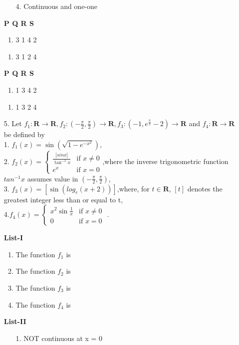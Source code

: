 \documentclass[journal,12pt,twocolumn]{IEEEtran}
\theoremstyle{remark}
\begin{document}
\begin{enumerate}
\begin{multicols}{2}
\begin{enumerate}
					\item[4.]  Continuous and one-one
				\end{enumerate}
		\end{multicols}
		\begin{multicols}{2}
			\textbf{   P Q R S}
			\begin{enumerate}[label=(\alph*)]
				\item 3 1 4 2
			\end{enumerate}
			\begin{enumerate}[label=(\alph*), start=3]
				\item 3 1 2 4
			\end{enumerate}
			\columnbreak
			\textbf{   P Q R S }
			\begin{enumerate}[label=(\alph*), start=2]
				\item 1 3 4 2 
			\end{enumerate}
			\begin{enumerate}[label=(\alph*)]
				\item 1 3 2 4
			\end{enumerate}
		\end{multicols}
            \item[ 5. ] Let $f_1: \textbf{R}\rightarrow \textbf{R},f_2:(-\frac{\pi}{2},\frac{\pi}{2})\rightarrow \textbf{R}, f_3:(-1,e^\frac{\pi}{2}-2)\rightarrow \textbf{R}$ and $f_4: \textbf{R}\rightarrow \textbf{R}$ be defined by \\
            1. $f_1(x)=\sin({\sqrt{1-e^{-x^2}}})$, \\
            2. $f_2(x) =
             \begin{cases}
                 \frac{|sin x|}{\tan^{-1}x} & \text{if } x \neq 0 \\
                 e^x & \text{if } x = 0 
                 \end{cases}$,where the inverse trigonometric function $tan^{-1}x $ assumes value in $(-\frac{\pi}{2},\frac{\pi}{2})$,\\
            3. $f_3(x)=[\sin({log_e(x+2)})]$,where, for $t\in \textbf{R}$, $[t]$ denotes the greatest integer less than or equal to t, \\
            4.$f_4(x) =
        \begin{cases}
                 x^2\sin{\frac{1}{x}} & \text{if } x \neq 0 \\
                 0 & \text{if } x = 0 
                 \end{cases}$ .
                 \begin{multicols}{2} 
				\textbf{List-I} 
				\begin{enumerate}[label=\Alph*., start=16]
					\item The function $f_1$ is
					\item The function $f_2$ is 
					\item The function $f_3$ is 
					\item The function $f_4$ is
				\end{enumerate}
				\columnbreak
				\textbf{List-II}
				\begin{enumerate}
					\item[1.]  NOT continuous at x = 0 


\end{enumerate}
\end{multicols}
\end{enumerate}
\end{document}

